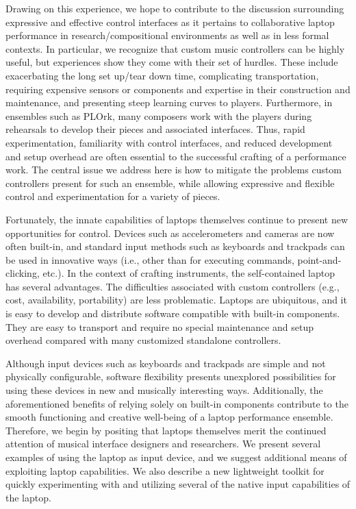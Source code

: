 Drawing on this experience, we hope to contribute to the discussion surrounding
expressive and effective control interfaces as it pertains to collaborative
laptop performance in research/compositional environments as well as in less
formal contexts. In particular, we recognize that custom music controllers can be
highly useful, but experiences show they come with their set of hurdles. These
include exacerbating the long set up/tear down time, complicating transportation,
requiring expensive sensors or components and expertise in their construction and
maintenance, and presenting steep learning curves to players. Furthermore, in
ensembles such as PLOrk, many composers work with the players during rehearsals
to develop their pieces and associated interfaces. Thus, rapid experimentation,
familiarity with control interfaces, and reduced development and setup overhead
are often essential to the successful crafting of a performance work. The central
issue we address here is how to mitigate the problems custom controllers present
for such an ensemble, while allowing expressive and flexible control and
experimentation for a variety of pieces.

Fortunately, the innate capabilities of laptops themselves continue to present
new opportunities for control. Devices such as accelerometers and cameras are now
often built-in, and standard input methods such as keyboards and trackpads can be
used in innovative ways (i.e., other than for executing commands,
point-and-clicking, etc.). In the context of crafting instruments, the
self-contained laptop has several advantages. The difficulties associated with
custom controllers (e.g., cost, availability, portability) are less problematic. 
Laptops are ubiquitous, and it is easy to develop and distribute software
compatible with built-in components. They are easy to transport and require no
special maintenance and setup overhead compared with many customized standalone
controllers.

Although input devices such as keyboards and trackpads are simple and not
physically configurable, software flexibility presents unexplored possibilities
for using these devices in new and musically interesting ways. Additionally, the
aforementioned benefits of relying solely on built-in components contribute to
the smooth functioning and creative well-being of a laptop performance ensemble.
Therefore, we begin by positing that laptops themselves merit the continued
attention of musical interface designers and researchers. We present several
examples of using the laptop as input device, and we suggest additional means of
exploiting laptop capabilities. We also describe a new lightweight toolkit for
quickly experimenting with and utilizing several of the native input capabilities
of the laptop.

